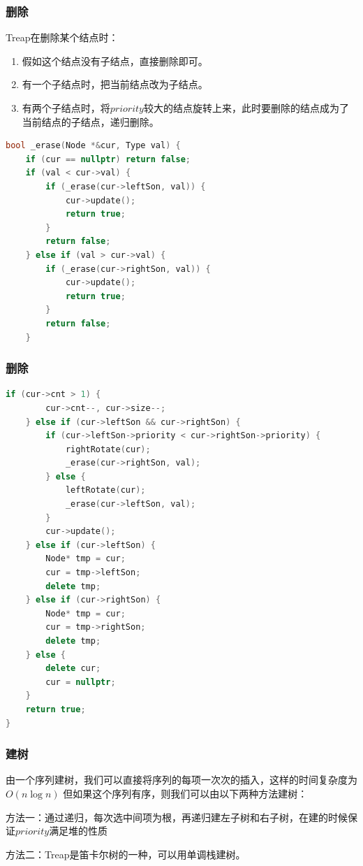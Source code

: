 \documentclass[utf8]{ctexbeamer}
\begin{document}
    \begin{frame}[fragile]
        \frametitle{删除}
        Treap在删除某个结点时：
        \begin{enumerate}
            \item 假如这个结点没有子结点，直接删除即可。
            \item 有一个子结点时，把当前结点改为子结点。
            \item 有两个子结点时，将$priority$较大的结点旋转上来，此时要删除的结点成为了当前结点的子结点，递归删除。
        \end{enumerate}
        \begin{lstlisting}[language=c++]
bool _erase(Node *&cur, Type val) {
    if (cur == nullptr) return false;
    if (val < cur->val) {
        if (_erase(cur->leftSon, val)) {
            cur->update();
            return true;
        }
        return false;
    } else if (val > cur->val) {
        if (_erase(cur->rightSon, val)) {
            cur->update();
            return true;
        }
        return false;
    }
        \end{lstlisting}
    \end{frame}

    \begin{frame}[fragile]
        \frametitle{删除}
        \begin{lstlisting}[language=c++]
    if (cur->cnt > 1) {
        cur->cnt--, cur->size--;
    } else if (cur->leftSon && cur->rightSon) {
        if (cur->leftSon->priority < cur->rightSon->priority) {
            rightRotate(cur);
            _erase(cur->rightSon, val);
        } else {
            leftRotate(cur);
            _erase(cur->leftSon, val);
        }
        cur->update();
    } else if (cur->leftSon) {
        Node* tmp = cur;
        cur = tmp->leftSon;
        delete tmp;
    } else if (cur->rightSon) {
        Node* tmp = cur;
        cur = tmp->rightSon;
        delete tmp;
    } else {
        delete cur;
        cur = nullptr;
    }
    return true;
}
        \end{lstlisting}
    \end{frame}

    \begin{frame}
        \frametitle{建树}
        由一个序列建树，我们可以直接将序列的每项一次次的插入，这样的时间复杂度为$O(n\log n)$
        但如果这个序列有序，则我们可以由以下两种方法建树：

        方法一：通过递归，每次选中间项为根，再递归建左子树和右子树，在建的时候保证$priority$满足堆的性质

        方法二：Treap是笛卡尔树的一种，可以用单调栈建树。
    \end{frame}
\end{document}
